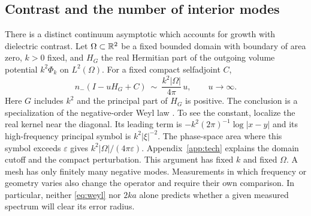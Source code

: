 \subsection{Contrast and the number of interior modes}

There is a distinct continuum asymptotic which accounts for growth with dielectric contrast. Let $\Omega\subset\mathbb R^2$ be a fixed bounded domain with boundary of area zero, $k>0$ fixed, and $H_G$ the real Hermitian part of the outgoing volume potential $k^2\Phi_k$ on $L^2(\Omega)$. For a fixed compact selfadjoint $C$,
\begin{equation}
 n_-(I-uH_G+C)\ \sim\ \frac{k^2|\Omega|}{4\pi}\,u,\qquad u\to\infty .
 \label{eq:weyl}
\end{equation}
Here $G$ includes $k^2$ and the principal part of $H_G$ is positive. The conclusion is a specialization of the negative-order Weyl law \cite{ponge}. To see the constant, localize the real kernel near the diagonal. Its leading term is $-k^2(2\pi)^{-1}\log|x-y|$ and its high-frequency principal symbol is $k^2|\xi|^{-2}$. The phase-space area where this symbol exceeds $\varepsilon$ gives $k^2|\Omega|/(4\pi\varepsilon)$. Appendix~\ref{app:tech} explains the domain cutoff and the compact perturbation. This argument has fixed $k$ and fixed $\Omega$. A mesh has only finitely many negative modes. Measurements in which frequency or geometry varies also change the operator and require their own comparison. In particular, neither \eqref{eq:weyl} nor $2ka$ alone predicts whether a given measured spectrum will clear its error radius.

